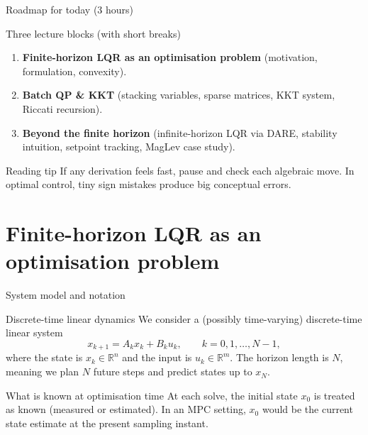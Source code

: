 \documentclass[aspectratio=169,11pt]{beamer}
\newcommand{\R}{\mathbb{R}}
\begin{document}
\begin{frame}{Roadmap for today (3 hours)}
\begin{block}{Three lecture blocks (with short breaks)}
\begin{enumerate}
  \item \textbf{Finite-horizon LQR as an optimisation problem} (motivation, formulation, convexity).
  \item \textbf{Batch QP \& KKT} (stacking variables, sparse matrices, KKT system, Riccati recursion).
  \item \textbf{Beyond the finite horizon} (infinite-horizon LQR via DARE, stability intuition, setpoint tracking, MagLev case study).
\end{enumerate}
\end{block}

\begin{alertblock}{Reading tip}
If any derivation feels fast, pause and check each algebraic move. In optimal control, tiny sign mistakes produce big conceptual errors.
\end{alertblock}
\end{frame}

\section{Finite-horizon LQR as an optimisation problem}

\begin{frame}{System model and notation}
\begin{block}{Discrete-time linear dynamics}
We consider a (possibly time-varying) discrete-time linear system
\[
  x_{k+1} = A_k x_k + B_k u_k, \qquad k = 0,1,\dots,N-1,
\]
where the state is $x_k \in \R^n$ and the input is $u_k \in \R^m$. The horizon length is $N$, meaning we plan $N$ future steps and predict states up to $x_N$.
\end{block}

\begin{block}{What is known at optimisation time}
At each solve, the initial state $x_0$ is treated as known (measured or estimated). In an MPC setting, $x_0$ would be the current state estimate at the present sampling instant.
\end{block}
\end{frame}
\end{document}
